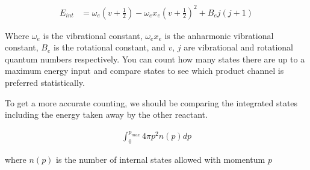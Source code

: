 \begin{align}
	E_{int} & = \omega_e\left(v + \frac{1}{2}\right) - \omega_ex_e\left(v+\frac{1}{2}\right)^2 + B_ej(j+1)
\end{align}

Where $\omega_e$ is the vibrational constant, $\omega_ex_e$ is the anharmonic vibrational constant, $B_e$ is the rotational constant, and $v$, $j$ are vibrational and rotational quantum numbers respectively. You can count how many states there are up to a maximum energy input and compare states to see which product channel is preferred statistically.

To get a more accurate counting, we should be comparing the integrated states including the energy taken away by the other reactant.

\begin{align}
	\int_0^{p_{max}}4\pi p^2 n(p) dp
\end{align}

where $n(p)$ is the number of internal states allowed with momentum $p$
